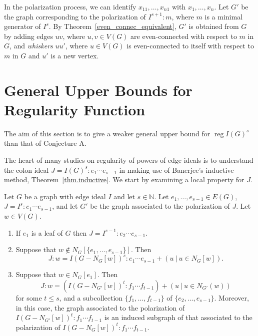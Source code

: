 \documentclass[ALCO,ThmDefs,Unicode,epreuves]{cedram}
\DeclareMathOperator{\reg}{reg}
\newcommand{\NN}{{\mathbb N}}
\newcommand*{\reg}{\mathrm{reg}}
\begin{document}
\begin{rema} \label{rmk.G'}
	In the polarization process, we can identify $x_{11}, \ldots, x_{n1}$ with $x_1, \ldots, x_n$. Let $G'$ be the graph corresponding to the polarization of $I^{s+1}:m$, where $m$ is a minimal generator of $I^s$. By Theorem~\ref{even_connec_equivalent}, $G'$ is obtained from $G$ by adding edges $uv$, where $u,v \in V(G)$ are even-connected with respect to $m$ in $G$, and \emph{whiskers} $uu'$, where $u \in V(G)$ is even-connected to itself with respect to $m$ in $G$ and $u'$ is a new vertex.
\end{rema}



\section{General Upper Bounds for Regularity Function} \label{chapter3}

The aim of this section is to give a weaker general upper bound for $\reg I(G)^s$ than that of Conjecture A.

The heart of many studies on regularity of powers of edge ideals is to understand the colon ideal $J = I(G)^s : e_1 \cdots e_{s-1}$ in making use of Banerjee's inductive method, Theorem~\ref{thm.inductive}. We start by examining a local property for $J$.

\begin{lemm} \label{lem.induction}
Let $G$ be a graph with edge ideal $I$ and let $s \in \NN$. Let $e_1, \dots, e_{s-1} \in E(G)$, $J = I^s : e_1 \cdots e_{s-1}$, and let $G'$ be the graph associated to the polarization of $J$. Let $w \in V(G)$.
\begin{enumerate}
\item\label{lemma3.1_1} If $e_1$ is a leaf of $G$ then $J = I^{s-1} : e_2 \cdots e_{s-1}$.
\item\label{lemma3.1_2} Suppose that $w \not\in N_G[\{e_1, \dots, e_{s-1}\}]$. Then
\[
J:w = I(G - N_G[w])^s : e_1 \cdots e_{s-1} + (u ~\big|~ u \in N_G[w]).
\]

\item\label{lemma3.1_3} Suppose that $w \in N_G[e_1]$. Then
\[
J:w = (I(G - N_{G'}[w])^t : f_1 \cdots f_{t-1}) + (u ~\big|~ u \in N_{G'}(w))
\]
for some $t \le s$, and a subcollection $\{f_1, \dots, f_{t-1}\}$ of $\{e_2, \dots, e_{s-1}\}$. Moreover, in this case, the graph associated to the polarization of $I(G-N_{G'}[w])^t : f_1 \cdots f_{t-1}$ is an induced subgraph of that associated to the polarization of $I(G-N_G[w])^t : f_1 \cdots f_{t-1}$.
\end{enumerate}
\end{lemm}
\end{document}
